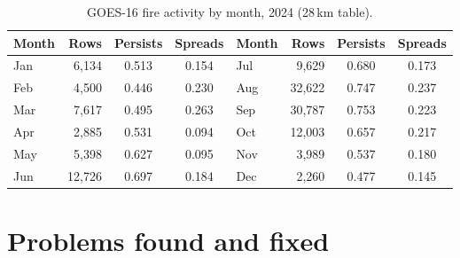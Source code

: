 \documentclass[11pt,a4paper,oneside]{report}
\begin{document}
\begin{table}[H]
\centering\small
\caption{GOES-16 fire activity by month, 2024 (28\,km table).}
\begin{tabular}{lrcc@{\hspace{1.2cm}}lrcc}
\toprule
Month & Rows & Persists & Spreads & Month & Rows & Persists & Spreads \\
\midrule
Jan & 6{,}134 & 0.513 & 0.154 & Jul & 9{,}629 & 0.680 & 0.173 \\
Feb & 4{,}500 & 0.446 & 0.230 & Aug & 32{,}622 & 0.747 & 0.237 \\
Mar & 7{,}617 & 0.495 & 0.263 & Sep & 30{,}787 & 0.753 & 0.223 \\
Apr & 2{,}885 & 0.531 & 0.094 & Oct & 12{,}003 & 0.657 & 0.217 \\
May & 5{,}398 & 0.627 & 0.095 & Nov & 3{,}989 & 0.537 & 0.180 \\
Jun & 12{,}726 & 0.697 & 0.184 & Dec & 2{,}260 & 0.477 & 0.145 \\
\bottomrule
\end{tabular}
\end{table}

\chapter{Problems found and fixed}
\end{document}

